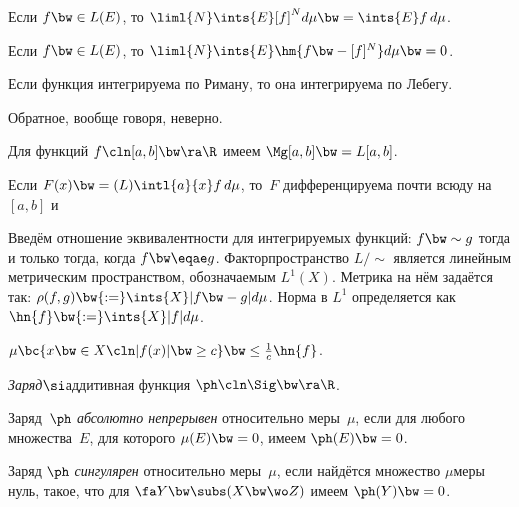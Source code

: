 \documentclass[a4paper,draft]{article}
\begin{document}
\begin{note}
  Если $f \bw\in L(E)$, то $\liml{N}\ints{E}[f]^N d\mu \bw= \ints{E}f\,d\mu$.
\end{note}

\begin{theorem}
  Если $f \bw\in L(E)$, то $\liml{N}\ints{E}\hm{f \bw-[f]^N}d\mu \bw=0$.
\end{theorem}

\begin{stm}
  Если функция интегрируема по Риману, то она интегрируема по Лебегу.
\end{stm}
\begin{note}
  Обратное, вообще говоря, неверно.
\end{note}

\begin{theorem}
  Для функций $f\cln [a,b] \bw\ra \R$ имеем $\Mg[a,b] \bw= L[a,b]$.
\end{theorem}

\begin{imp}
  Если $F(x) \bw= (L)\intl{a}{x}f\,d\mu$, то~$F$ дифференцируема почти всюду на~$[a,b]$ и
\end{imp}

\begin{df}
  Введём отношение эквивалентности для интегрируемых функций: $f \bw\sim g$
  тогда и только тогда, когда $f \bw\eqae g$. Факторпространство $L/\!\!\sim$ является линейным
  метрическим пространством, обозначаемым $L^1(X)$.
  Метрика на нём задаётся так: $\rho(f,g) \bw{:=} \ints{X}|f \bw- g|d\mu$.
  Норма в $L^1$ определяется как $\hn{f} \bw{:=} \ints{X} |f|d\mu$.
\end{df}

\begin{lemma}
  $\mu\bc{x \bw\in X\cln |f(x)|\bw\ge c} \bw\le \frac1c\hn{f}$.
\end{lemma}

\begin{df}
  \emph{Заряд}\т $\si$\д аддитивная функция $\ph\cln\Sig \bw\ra \R$.
\end{df}

\begin{df}
  Заряд~$\ph$ \emph{абсолютно непрерывен} относительно меры~$\mu$,
  если для любого множества~$E$, для которого $\mu(E) \bw= 0$, имеем $\ph(E) \bw= 0$.
\end{df}

\begin{df}
  Заряд $\ph$ \emph{сингулярен} относительно меры~$\mu$, если найдётся множество $\mu$\д меры нуль,
  такое, что для $\fa Y \bw\subs (X \bw\wo Z)$ имеем $\ph(Y) \bw= 0$.
\end{df}
\end{document}
